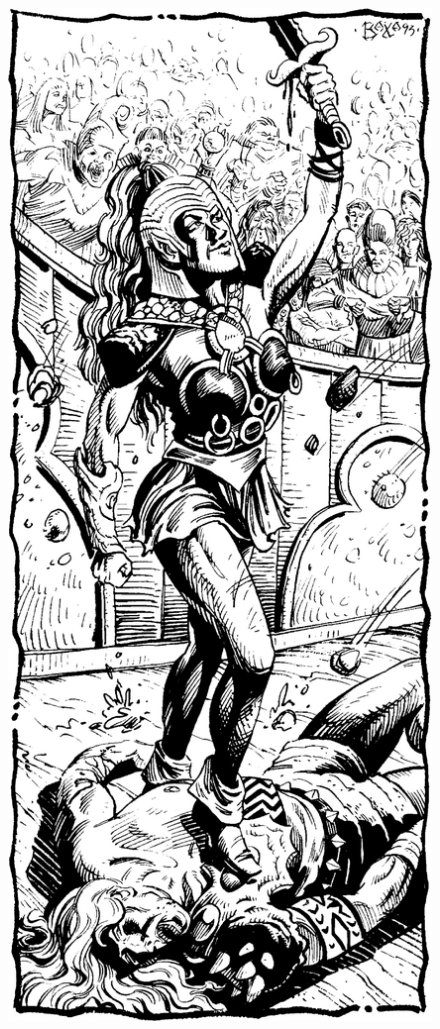 \begin{figure}[t!]
\centering
\includegraphics[width=\columnwidth]{images/gladiator-2.png}
\WOTC
\end{figure}

